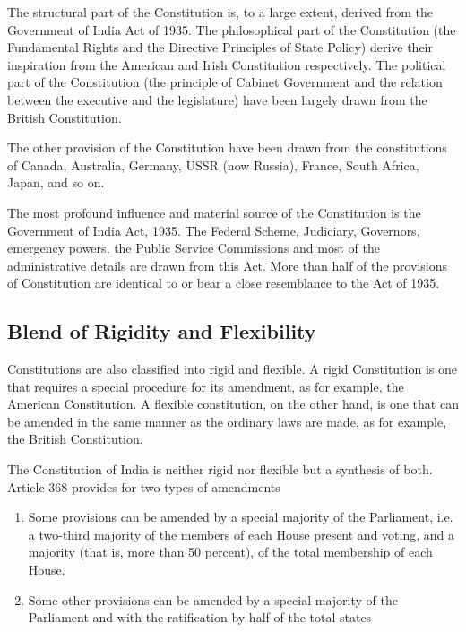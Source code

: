 The structural part of the Constitution is, to a large extent, derived from the Government of India Act of 1935. The philosophical part of the Constitution (the Fundamental Rights and the Directive Principles of State Policy) derive their inspiration from the American and Irish Constitution respectively. The political part of the Constitution (the principle of Cabinet Government and the relation between the executive and the legislature) have been largely drawn from the British Constitution.

The other provision of the Constitution have been drawn from the constitutions of Canada, Australia, Germany, USSR (now Russia), France, South Africa, Japan, and so on.

The most profound influence and material source of the Constitution is the Government of India Act, 1935. The Federal Scheme, Judiciary, Governors, emergency powers, the Public Service Commissions and most of the administrative details are drawn from this Act. More than half of the provisions of Constitution are identical to or bear a close resemblance to the Act of 1935.

\subsection{Blend of Rigidity and Flexibility}

Constitutions are also classified into rigid and flexible. A rigid Constitution is one that requires a special procedure for its amendment, as for example, the American Constitution. A flexible constitution, on the other hand, is one that can be amended in the same manner as the ordinary laws are made, as for example, the British Constitution.

The Constitution of India is neither rigid nor flexible but a synthesis of both. Article 368 provides for two types of amendments

\renewcommand{\labelenumi}{\textbf{(\alph{enumi})}}
\begin{enumerate}
  \item Some provisions can be amended by a special majority of the Parliament, i.e. a two-third majority of the members of each House present and voting, and a majority (that is, more than 50 percent), of the total membership of each House.
  \item Some other provisions can be amended by a special majority of the Parliament and with the ratification by half of the total states
\end{enumerate}

